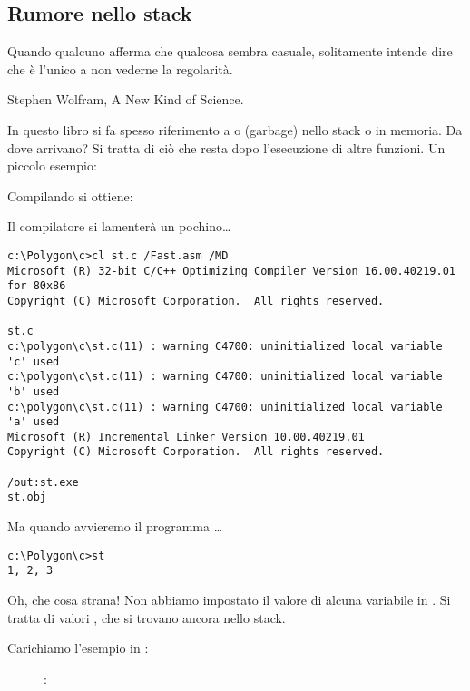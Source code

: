 \subsection{Rumore nello stack}
\label{noise_in_stack}

\epigraph{Quando qualcuno afferma che qualcosa sembra casuale, solitamente intende dire che è l'unico a non vederne la regolarità.}{Stephen Wolfram, A New Kind of Science.}

In questo libro si fa spesso riferimento a  o  (garbage) nello stack o in memoria.
Da dove arrivano?
Si tratta di ciò che resta dopo l'esecuzione di altre funzioni.
Un piccolo esempio:



Compilando si ottiene:



Il compilatore si lamenterà un pochino\dots

\begin{lstlisting}
c:\Polygon\c>cl st.c /Fast.asm /MD
Microsoft (R) 32-bit C/C++ Optimizing Compiler Version 16.00.40219.01 for 80x86
Copyright (C) Microsoft Corporation.  All rights reserved.

st.c
c:\polygon\c\st.c(11) : warning C4700: uninitialized local variable 'c' used
c:\polygon\c\st.c(11) : warning C4700: uninitialized local variable 'b' used
c:\polygon\c\st.c(11) : warning C4700: uninitialized local variable 'a' used
Microsoft (R) Incremental Linker Version 10.00.40219.01
Copyright (C) Microsoft Corporation.  All rights reserved.

/out:st.exe
st.obj
\end{lstlisting}

Ma quando avvieremo il programma \dots

\begin{lstlisting}
c:\Polygon\c>st
1, 2, 3
\end{lstlisting}

Oh, che cosa strana! Non abbiamo impostato il valore di alcuna variabile in .
Si tratta di valori , che si trovano ancora nello stack.

\clearpage
Carichiamo l'esempio in \olly:

\begin{figure}[H]
\centering
{}
\caption{\olly: }
\label{fig:stack_noise_olly1}
\end{figure}


